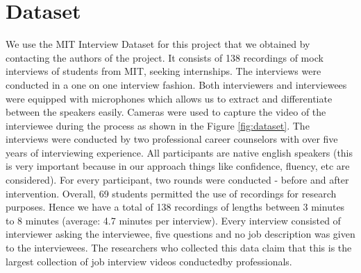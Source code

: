 \documentclass[11pt]{article}
\begin{document}
\section{Dataset}
We use the MIT Interview Dataset \cite{naim2015automated} for this project that we obtained by contacting the authors of the project. It consists of 138 recordings of mock interviews of students from MIT, seeking internships. The interviews were conducted in a one on one interview fashion. Both interviewers and interviewees were equipped with microphones which allows us to extract and differentiate between the speakers easily. Cameras were used to capture the video of the interviewee during the process as shown in the Figure \ref{fig:dataset}. The interviews were conducted by two professional career counselors with over five years of interviewing experience. All participants are native english speakers (this is very important because in our approach things like confidence, fluency, etc are considered). For every participant, two rounds were conducted - before and after intervention. Overall, 69 students permitted the use of recordings for research purposes. Hence we have a total of 138 recordings of lengths between 3 minutes to 8 minutes (average: 4.7 minutes per interview). Every interview consisted of interviewer asking the interviewee, five questions and no job description was given to the interviewees. The researchers who collected this data claim that this is the largest collection of job interview videos conductedby professionals.
\end{document}
